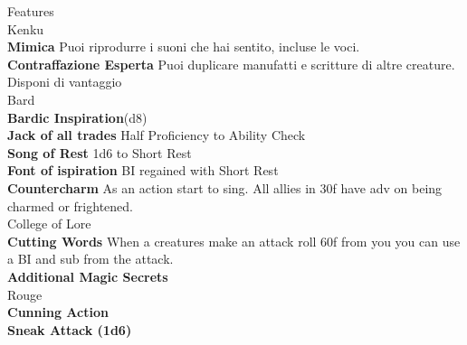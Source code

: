 \documentclass[11pt]{article}
\begin{document}
\vspace{1.4cm}
\begin{minipage}[t]{.5\textwidth}
{\huge \Fontauri Features}\\
\textcolor{OCRA}{Kenku}\\
\textbf{Mimica} Puoi riprodurre i suoni che hai sentito, incluse le voci.\\
\textbf{Contraffazione Esperta} Puoi duplicare manufatti e scritture di altre creature. Disponi di vantaggio \\
\textcolor{OCRA}{Bard}\\
\textbf{Bardic Inspiration}(d8)\\
\textbf{Jack of all trades} Half Proficiency to Ability Check\\
\textbf{Song of Rest} 1d6 to Short Rest\\
\textbf{Font of ispiration} BI regained with Short Rest\\
\textbf{Countercharm} As an action start to sing. All allies in 30f have adv on being charmed or frightened.\\
\textcolor{OCRA}{College of Lore}\\
\textbf{Cutting Words} When a creatures make an attack roll 60f from you you can use a BI and sub from the attack.\\
\textbf{Additional Magic Secrets}\\
\textcolor{OCRA}{Rouge}\\
\textbf{Cunning Action}\\
\textbf{Sneak Attack (1d6)}\\
\end{minipage}
\end{document}
